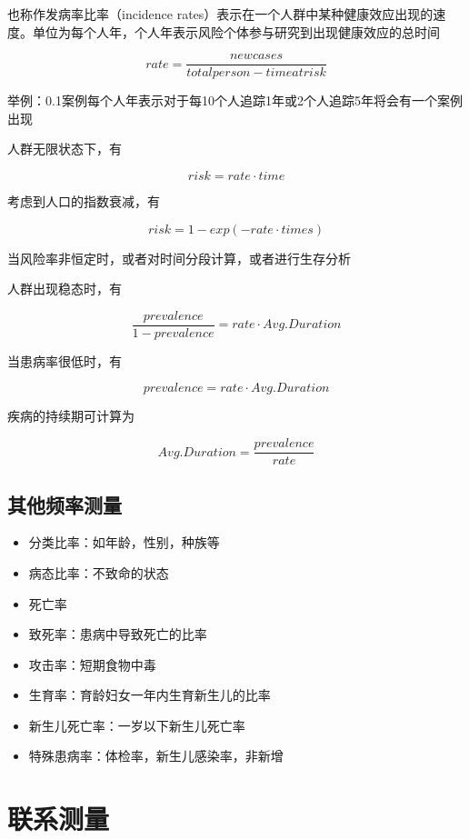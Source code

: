 \documentclass[]{book}
\providecommand{\tightlist}{%
  \setlength{\itemsep}{0pt}\setlength{\parskip}{0pt}}
\begin{document}
也称作发病率比率（incidence rates）表示在一个人群中某种健康效应出现的速度。单位为每个人年，个人年表示风险个体参与研究到出现健康效应的总时间

\[rate = \frac{new cases}{total person-time at risk}\]

举例：0.1案例每个人年表示对于每10个人追踪1年或2个人追踪5年将会有一个案例出现

人群无限状态下，有

\[risk = rate \cdot time\]

考虑到人口的指数衰减，有

\[risk = 1 - exp(- rate \cdot times)\]

当风险率非恒定时，或者对时间分段计算，或者进行生存分析

人群出现稳态时，有

\[\frac{prevalence}{1-prevalence} = rate \cdot Avg.Duration\]

当患病率很低时，有

\[prevalence = rate \cdot Avg.Duration\]

疾病的持续期可计算为

\[Avg.Duration = \frac{prevalence}{rate}\]

\hypertarget{ux5176ux4ed6ux9891ux7387ux6d4bux91cf}{%
\subsection{其他频率测量}\label{ux5176ux4ed6ux9891ux7387ux6d4bux91cf}}

\begin{itemize}
\tightlist
\item
  分类比率：如年龄，性别，种族等
\item
  病态比率：不致命的状态
\item
  死亡率
\item
  致死率：患病中导致死亡的比率
\item
  攻击率：短期食物中毒
\item
  生育率：育龄妇女一年内生育新生儿的比率
\item
  新生儿死亡率：一岁以下新生儿死亡率
\item
  特殊患病率：体检率，新生儿感染率，非新增
\end{itemize}

\hypertarget{ux8054ux7cfbux6d4bux91cf}{%
\section{联系测量}\label{ux8054ux7cfbux6d4bux91cf}}
\end{document}
